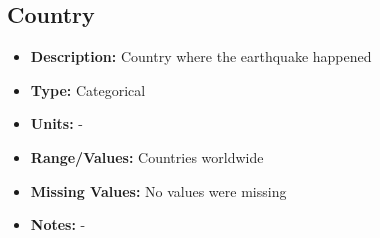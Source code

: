 \documentclass{article}
\begin{document}

\subsection{Country}
\begin{itemize}
    \item \textbf{Description:} Country where the earthquake happened
    \item \textbf{Type:} Categorical
    \item \textbf{Units:} -
    \item \textbf{Range/Values:} Countries worldwide
    \item \textbf{Missing Values:} No values were missing
    \item \textbf{Notes:} -
\end{itemize}

\end{document}
